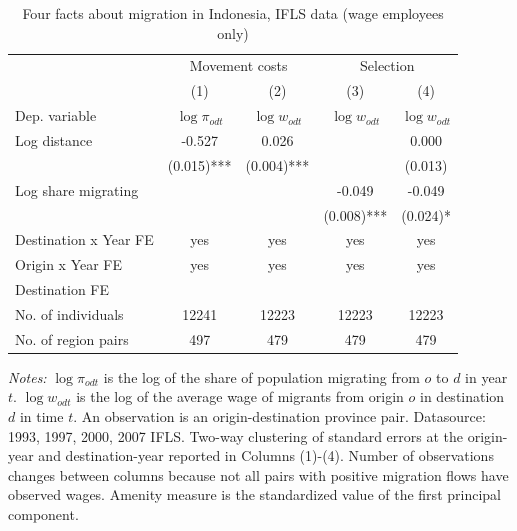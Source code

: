 \begin{table}[hbpt] \begin{center}\begin{threeparttable}\caption{ {Four facts about migration in Indonesia, IFLS data (wage employees only)    }} \begin{tabular}{l*{4}c} \toprule
&\multicolumn{2}{c}{Movement costs}&\multicolumn{2}{c}{Selection}\\
&(1)&(2)&(3)&(4)\\
Dep. variable&$\log \pi_{odt}$&$\log w_{odt}$ &$\log w_{odt}$ &$\log w_{odt}$ \\
\midrule
Log distance&-0.527&0.026&&0.000\\
&(0.015)***&(0.004)***&&(0.013)\\
Log share migrating&&&-0.049&-0.049\\
&&&(0.008)***&(0.024)*\\
\midrule
Destination x Year FE&yes&yes&yes&yes\\
Origin x Year FE&yes&yes&yes&yes\\
Destination FE&&&&\\
No. of individuals&12241&12223&12223&12223\\
No. of region pairs&497&479&479&479\\
\bottomrule \end{tabular} \label{Four facts about migration in Indonesia, IFLS data (wage employees only)    } \begin{tablenotes} \item {\footnotesize \emph{Notes: } $\log \pi_{odt}$ is the log of the share of population migrating from $ o $ to $ d $ in year $ t $. $\log w_{odt}$ is the log of the average wage of migrants from origin $ o $ in destination $ d $ in time $ t $. An observation is an origin-destination province pair. Datasource: 1993, 1997, 2000, 2007 IFLS. Two-way clustering of standard errors at the origin-year and destination-year reported in Columns (1)-(4). Number of observations changes between columns because not all pairs with positive migration flows have observed wages. Amenity measure is the standardized value of the first principal component. } \end{tablenotes} \end{threeparttable} \end{center} \end{table}
